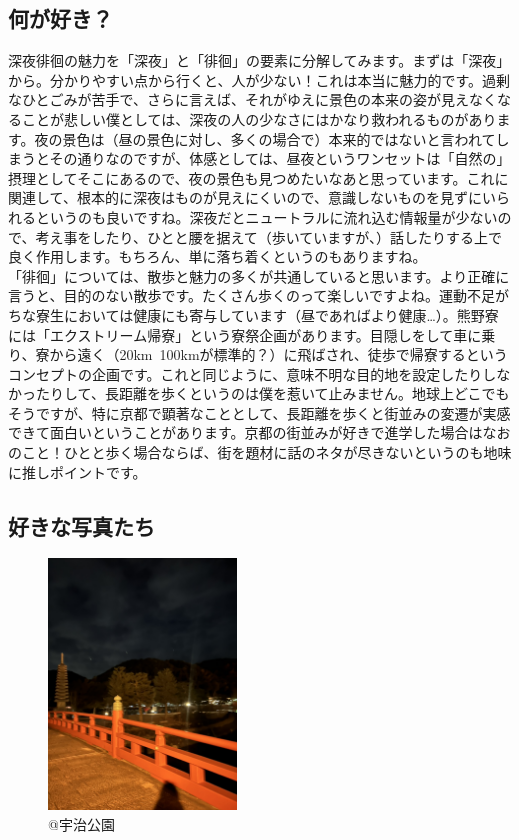 \subsection{何が好き？}
深夜徘徊の魅力を「深夜」と「徘徊」の要素に分解してみます。まずは「深夜」から。分かりやすい点から行くと、人が少ない！これは本当に魅力的です。過剰なひとごみが苦手で、さらに言えば、それがゆえに景色の本来の姿が見えなくなることが悲しい僕としては、深夜の人の少なさにはかなり救われるものがあります。夜の景色は（昼の景色に対し、多くの場合で）本来的ではないと言われてしまうとその通りなのですが、体感としては、昼夜というワンセットは「自然の」摂理としてそこにあるので、夜の景色も見つめたいなあと思っています。これに関連して、根本的に深夜はものが見えにくいので、意識しないものを見ずにいられるというのも良いですね。深夜だとニュートラルに流れ込む情報量が少ないので、考え事をしたり、ひとと腰を据えて（歩いていますが、）話したりする上で良く作用します。もちろん、単に落ち着くというのもありますね。\\ \indent
「徘徊」については、散歩と魅力の多くが共通していると思います。より正確に言うと、目的のない散歩です。たくさん歩くのって楽しいですよね。運動不足がちな寮生においては健康にも寄与しています（昼であればより健康…）。熊野寮には「エクストリーム帰寮」という寮祭企画があります。目隠しをして車に乗り、寮から遠く（20km~100kmが標準的？）に飛ばされ、徒歩で帰寮するというコンセプトの企画です。これと同じように、意味不明な目的地を設定したりしなかったりして、長距離を歩くというのは僕を惹いて止みません。地球上どこでもそうですが、特に京都で顕著なこととして、長距離を歩くと街並みの変遷が実感できて面白いということがあります。京都の街並みが好きで進学した場合はなおのこと！ひとと歩く場合ならば、街を題材に話のネタが尽きないというのも地味に推しポイントです。\\ \indent

\subsection{好きな写真たち}
\begin{figure}[H]
    \centering
    \includegraphics[width=5cm]{2025shinki/shinya_haikai/image1.png}
    \caption{@宇治公園}
    \label{fig:enter-label1}
\end{figure}


